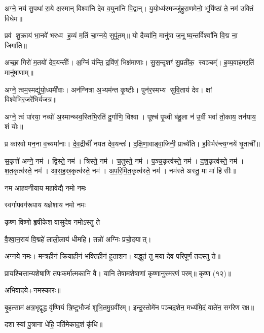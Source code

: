 अग्ने॒ नय॑ सु॒पथा॑ रा॒ये अ॒स्मान् विश्वा॑नि देव व॒युना॑नि वि॒द्वान्। यु॒यो॒ध्य॑स्मज्जु॑हुरा॒णमेनो॒ भूयि॑ष्ठां ते॒ नम॑ उक्तिं विधेम॥ 

प्रव॑ शु॒क्राय॑ भा॒नवे॑ भरध्व ह॒व्यं म॒तिं चा॒ग्नये॒ सुपू॑तम्॥ यो दैव्या॑नि॒ मानु॑षा ज॒नूष्य॒न्तर्विश्वा॑नि वि॒द्म ना॒ जिगा॑ति॥

अच्छा॒ गिरो॑ म॒तयो॑ देव॒यन्तीः᳚। अ॒ग्निं य॑न्ति॒ द्रवि॑णं॒ भिक्ष॑माणाः।
सु॒स॒न्दृशꣳ॑ सु॒प्रती॑क॒ स्वञ्चम्᳚। ह॒व्य॒वाह॑मर॒तिं मानु॑षाणाम्॥

अग्ने॒ त्वम॒स्मद्यु॑यो॒ध्यमी॑वाः। अन॑ग्नित्रा अ॒भ्यम॑न्त कृ॒ष्टीः।
पुन॑र॒स्मभ्य सुवि॒ताय॑ देव। क्षां विश्वे॑भिर॒जरे॑भिर्यजत्र॥ 

अग्ने॒ त्वं पा॑रया॒ नव्यो॑ अ॒स्मान्थ्स्व॒स्तिभि॒रति॑ दु॒र्गाणि॒ विश्वा।
पूश्च॑ पृ॒थ्वी ब॑हु॒ला न॑ उ॒र्वी भवा॑ तो॒काय॒ तन॑याय॒ शं योः॥

प्र का॑रवो मन॒ना व॒च्यमा॑नाः। दे॒व॒द्रीचीं᳚ नयत देव॒यन्तः॑।
द॒क्षि॒णा॒वाड्वा॒जिनी॒ प्राच्ये॑ति। ह॒विर्भर॑न्त्य॒ग्नये॑ घृ॒ताची᳚॥

स॒कृत्ते॑ अग्ने॒ नम॑। द्विस्ते॒ नम॑। त्रिस्ते॒ नम॑। च॒तुस्ते॒ नम॑। प॒ञ्च॒कृत्व॑स्ते॒ नम॑। द॒श॒कृत्व॑स्ते॒ नम॑। श॒त॒कृत्व॑स्ते॒ नम॑। आ॒स॒ह॒स्र॒कृत्व॑स्ते॒ नम॑। अ॒प॒रि॒मि॒त॒कृत्व॑स्ते॒ नम॑। नम॑स्ते अस्तु॒ मा मा॑ हिसीः॥

{नम आहवनीयाय महावेद्यै नमो नमः}

{स्वर्गापवर्गरूपाय यज्ञेशाय नमो नमः}

{कृष्ण विष्णो हृषीकेश वासुदेव नमोऽस्तु ते}

वै॒श्वा॒न॒राय॑ वि॒द्महे॑ लाली॒लाय॑ धीमहि। 
तन्नो॑ अग्निः प्रचो॒दयात्। 

अग्नये नमः। मन्त्रहीनं क्रियाहीनं भक्तिहीनं हुताशन।
यद्धुतं तु मया देव परिपूर्णं तदस्तु ते॥

प्रायश्चित्तान्यशेषाणि तपःकर्मात्मकानि वै।
यानि तेषामशेषाणां कृष्णानुस्मरणं परम्॥ कृष्ण (१२)॥

अभिवादये+नमस्कारः॥

बृ॒हत्साम॑ क्षत्र॒भृद्वृ॒द्ध वृ॑ष्णियं त्रि॒ष्टुभौजः॑ शुभि॒तमु॒ग्रवी॑रम्।
इन्द्र॒स्तोमे॑न पञ्चद॒शेन॒ मध्य॑मि॒दं वाते॑न॒ सग॑रेण रक्ष॥

दशास्यां पु॒त्राना धे॑हि॒ पति॑मेकाद॒शं कृ॑धि॥
